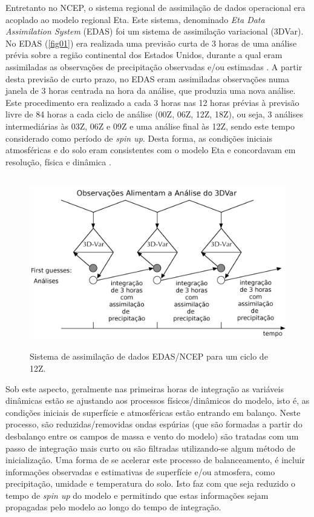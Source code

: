 Entretanto no NCEP, o sistema regional de assimilação de dados operacional era acoplado ao modelo regional Eta. Este sistema, denominado \textit{Eta Data Assimilation System} (EDAS) foi um sistema de assimilação variacional (3DVar). No EDAS (\autoref{fig01}) era realizada uma previsão curta de 3 horas de uma análise prévia sobre a região continental dos Estados Unidos, durante a qual eram assimiladas as observações de precipitação observadas e/ou estimadas \cite{messingeretal06}. A partir desta previsão de curto prazo, no EDAS eram assimiladas observações numa janela de 3 horas centrada na hora da análise, que produzia uma nova análise. Este procedimento era realizado a cada 3 horas nas 12 horas prévias à previsão livre de 84 horas a cada ciclo de análise (00Z, 06Z, 12Z, 18Z), ou seja, 3 análises intermediárias às 03Z, 06Z e 09Z e uma análise final às 12Z, sendo este tempo considerado como período de \textit{spin up}. Desta forma, as condições iniciais atmosféricas e do solo eram consistentes com o modelo Eta e concordavam em resolução, física e dinâmica \cite{rogersetal96}. 

\begin{figure}[!hbp]
\centering
\includegraphics[height=7.5cm]{./figs/edas_pt.png}
\caption{Sistema de assimilação de dados EDAS/NCEP para um ciclo de 12Z.}
\label{fig01}
\end{figure}

Sob este aspecto, geralmente nas primeiras horas de integração as variáveis dinâmicas estão se ajustando aos processos físicos/dinâmicos do modelo, isto é, as condições iniciais de superfície e atmosféricas estão entrando em balanço. Neste processo, são reduzidas/removidas ondas espúrias (que são formadas a partir do desbalanço entre os campos de massa e vento do modelo) são tratadas com um passo de integração mais curto ou são filtradas utilizando-se algum método de inicialização. Uma forma de se acelerar este processo de balanceamento, é incluir informações observadas e estimativas de superfície e/ou atmosfera, como precipitação, umidade e temperatura do solo. Isto faz com que seja reduzido o tempo de \textit{spin up} do modelo e permitindo que estas informações sejam propagadas pelo modelo ao longo do tempo de integração.

